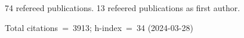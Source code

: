 74 refereed publications. 13 refeered publications as first author.

Total citations~=~3913; h-index~=~34 (2024-03-28)